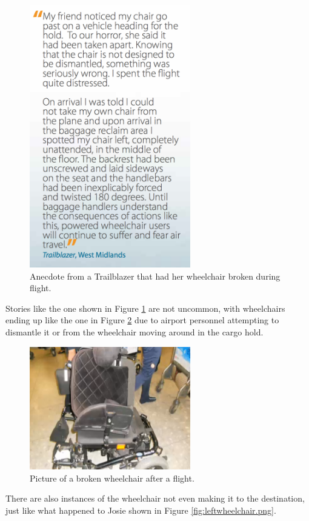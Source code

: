 \begin{figure}[h]
  \centering
     \includegraphics[width=7cm]{images/wheelchairstory.png}
   \caption{Anecdote from a Trailblazer that had her wheelchair broken during flight.}
  \label{fig:wheelchairstory.png}
\end{figure}

Stories like the one shown in Figure \ref{fig:wheelchairstory.png} are not uncommon, with wheelchairs ending up like the one in Figure \ref{fig:brokenwheelchair.png} due to airport personnel attempting to dismantle it or from the wheelchair moving around in the cargo hold. 


\begin{figure}[h]
  \centering
     \includegraphics[width=7cm]{images/brokenwheelchair.png}
   \caption{Picture of a broken wheelchair after a flight.}
  \label{fig:brokenwheelchair.png}
\end{figure}

There are also instances of the wheelchair not even making it to the destination, just like what happened to Josie shown in Figure \ref{fig:leftwheelchair.png}. 

